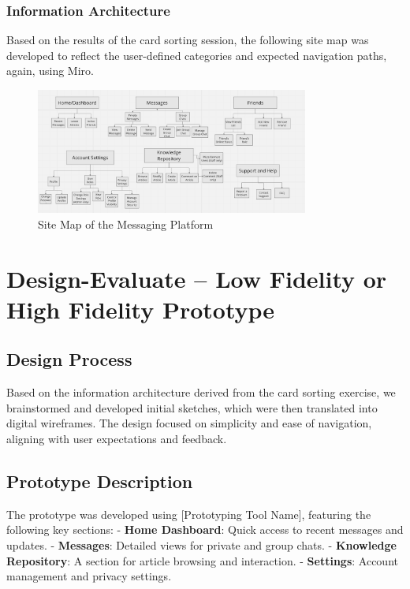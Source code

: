 \documentclass[12pt,a4paper]{article}
\begin{document}
\subsubsection{Information Architecture}
Based on the results of the card sorting session, the following site map was developed to reflect the user-defined categories and expected navigation paths, again, using Miro.

\begin{figure}[h]
\centering
\includegraphics[width=0.8\textwidth]{sitemap.png} %
\caption{Site Map of the Messaging Platform}
\label{fig:sitemap}
\end{figure}

\section{Design-Evaluate – Low Fidelity or High Fidelity Prototype }
\subsection{Design Process}
Based on the information architecture derived from the card sorting exercise, we brainstormed and developed initial sketches, which were then translated into digital wireframes. The design focused on simplicity and ease of navigation, aligning with user expectations and feedback.

\subsection{Prototype Description}
The prototype was developed using [Prototyping Tool Name], featuring the following key sections:
- \textbf{Home Dashboard}: Quick access to recent messages and updates.
- \textbf{Messages}: Detailed views for private and group chats.
- \textbf{Knowledge Repository}: A section for article browsing and interaction.
- \textbf{Settings}: Account management and privacy settings.
\end{document}
